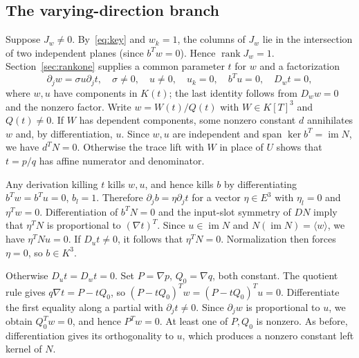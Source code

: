 \documentclass[11pt,a4paper]{article}
\newcommand{\rank}{\operatorname{rank}}
\newcommand{\im}{\operatorname{im}}
\begin{document}
\subsection{The varying-direction branch}
Suppose $J_w\ne0$. By~\eqref{eq:key} and $w_k=1$, the columns of $J_w$ lie in the intersection of two independent planes (since $b^Tw=0$). Hence $\rank J_w=1$. Section~\ref{sec:rankone} supplies a common parameter $t$ for $w$ and a factorization
\[
 \partial_jw=\sigma u\partial_jt,\quad \sigma\ne0,\quad u\ne0,\quad
 u_k=0,\quad b^Tu=0,\quad D_wt=0,
\]
where $w,u$ have components in $K(t)$; the last identity follows from $D_ww=0$ and the nonzero factor. Write $w=W(t)/Q(t)$ with $W\in K[T]^3$ and $Q(t)\ne0$. If $W$ has dependent components, some nonzero constant $d$ annihilates $w$ and, by differentiation, $u$. Since $w,u$ are independent and span $\ker b^T=\im N$, we have $d^TN=0$. Otherwise the trace lift with $W$ in place of $U$ shows that $t=p/q$ has affine numerator and denominator.

Any derivation killing $t$ kills $w,u$, and hence kills $b$ by differentiating $b^Tw=b^Tu=0$, $b_l=1$. Therefore $\partial_j b=\eta\partial_jt$ for a vector $\eta\in E^3$ with $\eta_l=0$ and $\eta^Tw=0$. Differentiation of $b^TN=0$ and the input-slot symmetry of $DN$ imply that $\eta^TN$ is proportional to $(\nabla t)^T$. Since $u\in\im N$ and $N(\im N)=\langle w\rangle$, we have $\eta^TNu=0$. If $D_ut\ne0$, it follows that $\eta^TN=0$. Normalization then forces $\eta=0$, so $b\in K^3$.

Otherwise $D_ut=D_wt=0$. Set $P=\nabla p$, $Q_0=\nabla q$, both constant. The quotient rule gives $q\nabla t=P-tQ_0$, so $(P-tQ_0)^Tw=(P-tQ_0)^Tu=0$. Differentiate the first equality along a partial with $\partial_jt\ne0$. Since $\partial_jw$ is proportional to $u$, we obtain $Q_0^Tw=0$, and hence $P^Tw=0$. At least one of $P,Q_0$ is nonzero. As before, differentiation gives its orthogonality to $u$, which produces a nonzero constant left kernel of $N$.
\end{document}
